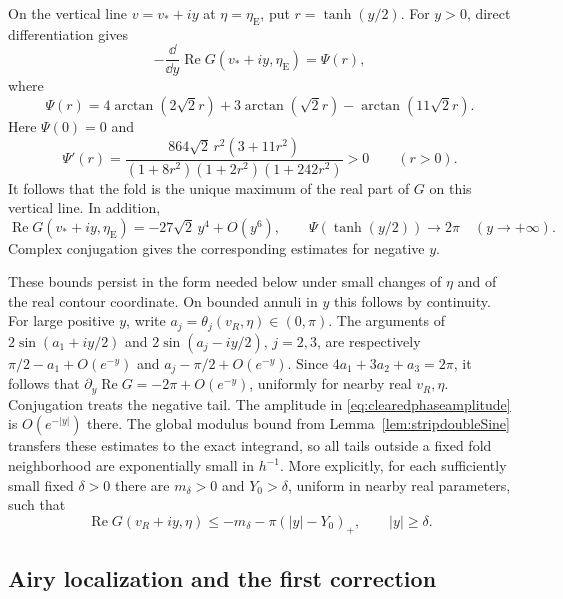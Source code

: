 On the vertical line $v=v_*+iy$ at $\eta=\eta_{\mathrm E}$,
put $r=\tanh(y/2)$. For $y>0$, direct differentiation gives
\begin{equation}
 -\frac{\dd}{\dd y}\operatorname{Re}G(v_*+iy,\eta_{\mathrm E})
 =\Psi(r),
 \label{eq:verticalphasegap}
\end{equation}
where
\[
 \Psi(r)=4\arctan(2\sqrt2r)
          +3\arctan(\sqrt2r)-\arctan(11\sqrt2r).
\]
Here $\Psi(0)=0$ and
\begin{equation}
 \Psi'(r)=
 \frac{864\sqrt2\,r^2(3+11r^2)}
 {(1+8r^2)(1+2r^2)(1+242r^2)}>0
 \qquad(r>0).
 \label{eq:verticalphasepositivity}
\end{equation}
It follows that the fold is the unique maximum of the real part
of $G$ on this vertical line. In addition,
\[
 \operatorname{Re}G(v_*+iy,\eta_{\mathrm E})
   =-27\sqrt2\,y^4+O(y^6),\qquad
 \Psi(\tanh(y/2))\longrightarrow2\pi
 \quad(y\to+\infty).
\]
Complex conjugation gives the corresponding estimates for
negative $y$.

These bounds persist in the form needed below under small
changes of $\eta$ and of the real contour coordinate. On bounded
annuli in $y$ this follows by continuity. For large positive $y$,
write $a_j=\theta_j(v_R,\eta)\in(0,\pi)$. The arguments of
$2\sin(a_1+iy/2)$ and $2\sin(a_j-iy/2)$, $j=2,3$,
are respectively $\pi/2-a_1+O(e^{-y})$ and
$a_j-\pi/2+O(e^{-y})$. Since
$4a_1+3a_2+a_3=2\pi$, it follows that
$\partial_y\operatorname{Re}G=-2\pi+O(e^{-y})$,
uniformly for nearby real $v_R,\eta$. Conjugation treats the
negative tail. The amplitude in
\eqref{eq:clearedphaseamplitude} is $O(e^{-|y|})$ there.
The global modulus bound from
Lemma~\ref{lem:stripdoubleSine} transfers these estimates to
the exact integrand, so all tails outside a fixed fold
neighborhood are exponentially small in $h^{-1}$. More
explicitly, for each sufficiently small fixed $\delta>0$ there
are $m_\delta>0$ and $Y_0>\delta$, uniform in nearby real
parameters, such that
\[
 \operatorname{Re}G(v_R+iy,\eta)
 \le -m_\delta-\pi(|y|-Y_0)_+,
 \qquad |y|\ge\delta.
\]

\subsection{Airy localization and the first correction}

